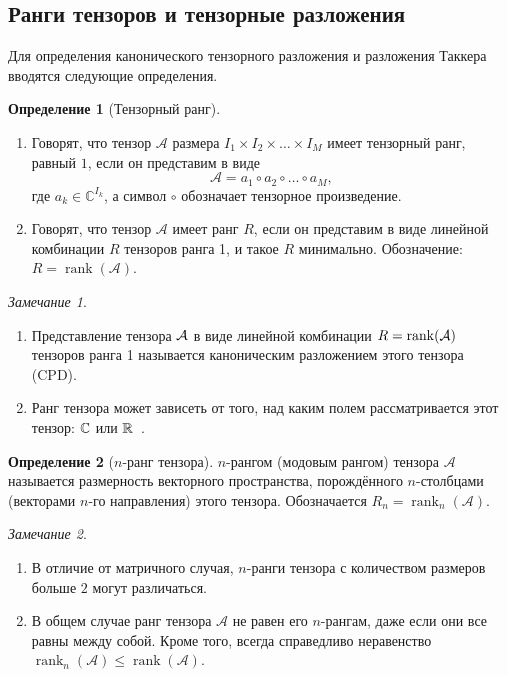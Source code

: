 \documentclass[specialist,
    substylefile=spbu.rtx,
    subf,href,colorlinks=true, 12pt]{disser}
\theoremstyle{plain}
\theoremstyle{definition}
\newtheorem{definition}{Определение}[section]
\theoremstyle{remark}
\newtheorem*{remark}{Замечание}
\begin{document}
    \subsection{Ранги тензоров и тензорные разложения}\label{subsec:tensor-ranks}
    Для определения канонического тензорного разложения и разложения Таккера вводятся следующие определения.
    \newpage
    \begin{definition}[Тензорный ранг]
        \leavevmode
        \begin{enumerate}
            \item Говорят, что тензор $\mathcal{A}$ размера $I_1\times I_2\times \ldots \times I_M$ имеет тензорный ранг, равный $1$, если он представим в виде
            \[
            \mathcal{A}=a_1\circ a_2\circ \ldots \circ a_M,
            \]
            где $a_{k} \in \mathbb{C}^{I_k}$, а символ $\circ$ обозначает тензорное произведение.
            \item Говорят, что тензор $\mathcal{A}$ имеет ранг $R$, если он представим в виде линейной комбинации $R$ тензоров
            ранга 1, и такое $R$ минимально.
            Обозначение: $R=\operatorname{rank}(\mathcal{A})$.
        \end{enumerate}
    \end{definition}
    \begin{remark}
        \begin{enumerate}
            \item Представление тензора $\mathcal{A}$ в виде линейной комбинации $R = \operatorname{rank}(\mathcal{A})$ тензоров ранга 1 называется каноническим разложением этого тензора (CPD).
            \item Ранг тензора может зависеть от того, над каким полем рассматривается этот тензор:
            $\mathbb{C}$ или $\mathbb{R}$~\cite{tensor-bg}.
        \end{enumerate}
    \end{remark}

    \begin{definition}[$n$-ранг тензора]
        $n$-рангом (модовым рангом) тензора $\mathcal{A}$ называется размерность векторного пространства, порождённого
        $n$-столбцами (векторами $n$-го направления) этого тензора.
        Обозначается $R_n=\operatorname{rank}_{n}(\mathcal{A})$.
    \end{definition}

    \begin{remark}
        \begin{enumerate}
            \item В отличие от матричного случая, $n$-ранги тензора с количеством размеров больше $2$ могут различаться.
            \item В общем случае ранг тензора $\mathcal{A}$ не равен его $n$-рангам, даже если они все равны между
            собой.
            Кроме того, всегда справедливо неравенство
            $\operatorname{rank}_n(\mathcal{A})\leqslant \operatorname{rank}(\mathcal{A})$.
        \end{enumerate}
    \end{remark}
\end{document}
